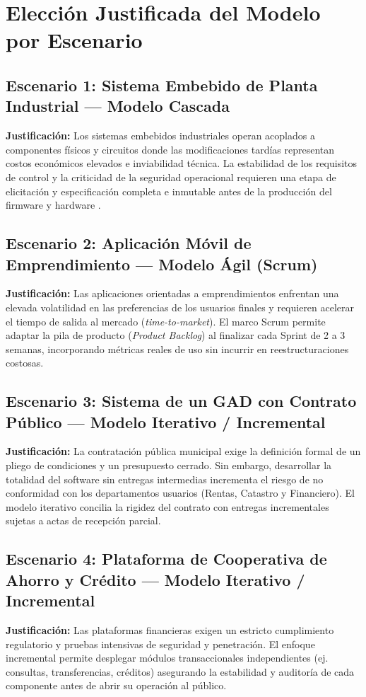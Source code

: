 \documentclass[conference]{IEEEtran}
\begin{document}
	\section{Elección Justificada del Modelo por Escenario}
	
	\subsection{Escenario 1: Sistema Embebido de Planta Industrial --- Modelo Cascada}
	\noindent\textbf{Justificación:} Los sistemas embebidos industriales operan acoplados a componentes físicos y circuitos donde las modificaciones tardías representan costos económicos elevados e inviabilidad técnica. La estabilidad de los requisitos de control y la criticidad de la seguridad operacional requieren una etapa de elicitación y especificación completa e inmutable antes de la producción del firmware y hardware \cite{ieee29148}.
	
	\subsection{Escenario 2: Aplicación Móvil de Emprendimiento --- Modelo Ágil (Scrum)}
	\noindent\textbf{Justificación:} Las aplicaciones orientadas a emprendimientos enfrentan una elevada volatilidad en las preferencias de los usuarios finales y requieren acelerar el tiempo de salida al mercado (\emph{time-to-market}). El marco Scrum permite adaptar la pila de producto (\emph{Product Backlog}) al finalizar cada Sprint de 2 a 3 semanas, incorporando métricas reales de uso sin incurrir en reestructuraciones costosas.
	
	\subsection{Escenario 3: Sistema de un GAD con Contrato Público --- Modelo Iterativo / Incremental}
	\noindent\textbf{Justificación:} La contratación pública municipal exige la definición formal de un pliego de condiciones y un presupuesto cerrado. Sin embargo, desarrollar la totalidad del software sin entregas intermedias incrementa el riesgo de no conformidad con los departamentos usuarios (Rentas, Catastro y Financiero). El modelo iterativo concilia la rigidez del contrato con entregas incrementales sujetas a actas de recepción parcial.
	
	\subsection{Escenario 4: Plataforma de Cooperativa de Ahorro y Crédito --- Modelo Iterativo / Incremental}
	\noindent\textbf{Justificación:} Las plataformas financieras exigen un estricto cumplimiento regulatorio y pruebas intensivas de seguridad y penetración. El enfoque incremental permite desplegar módulos transaccionales independientes (ej. consultas, transferencias, créditos) asegurando la estabilidad y auditoría de cada componente antes de abrir su operación al público.
	
\end{document}
